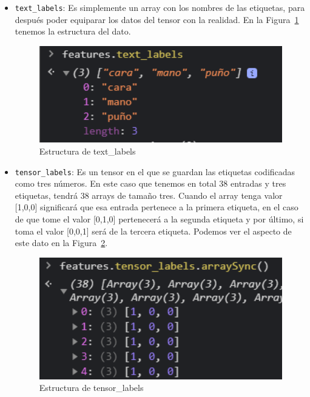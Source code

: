 \documentclass[a4paper, 12pt]{book}
\begin{document}
\begin{itemize}
 
	\item \texttt{text\_labels}: Es simplemente un array con los nombres de las etiquetas, para después poder equiparar los datos del tensor con la realidad. En la Figura~\ref{fig:textlabels} tenemos la estructura del dato.

\begin{figure}
	\centering
	\includegraphics[width=12cm, keepaspectratio]{img/textlabels}
	\caption{Estructura de text\_labels}				
	\label{fig:textlabels}
\end{figure}

	\item \texttt{tensor\_labels}: Es un tensor en el que se guardan las etiquetas codificadas como tres números. En este caso que tenemos en total 38 entradas y tres etiquetas, tendrá 38 arrays de tamaño tres. Cuando el array tenga valor [1,0,0] significará que esa entrada pertenece a la primera etiqueta, en el caso de que tome el valor [0,1,0] pertenecerá a la segunda etiqueta y por último, si toma el valor [0,0,1] será de la tercera etiqueta. Podemos ver el aspecto de este dato en la Figura~\ref{fig:tensorlabels}.

\begin{figure}
	\centering
	\includegraphics[width=12cm, keepaspectratio]{img/tensorlabels}
	\caption{Estructura de tensor\_labels}				
	\label{fig:tensorlabels}
\end{figure}
	

\end{itemize}
\end{document}
